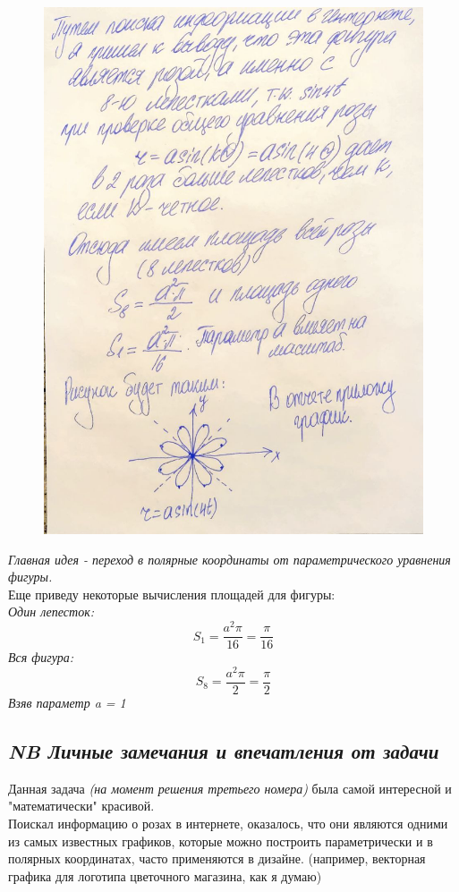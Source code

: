 \documentclass[a4paper,12pt]{article}
\begin{document}
\begin{figure}[H]
    \centering
    \includegraphics[width=0.8\linewidth]{../img/3_2.jpg}
    \caption{}
    \label{fig:part1}
\end{figure}

\emph{Главная идея - переход в полярные координаты от параметрического уравнения фигуры.}\\
Еще приведу некоторые вычисления площадей для фигуры:\\
\emph{Один лепесток:}
\[
S_1 = \frac{a^2  \pi}{16} = \frac{\pi}{16}
\]
\emph{Вся фигура:}
\[
S_8 = \frac{a^2  \pi}{2} = \frac{\pi}{2}
\]
\emph{Взяв параметр a = 1}

\subsection*{\emph{NB Личные замечания и впечатления от задачи}}
Данная задача \emph{(на момент решения третьего номера)} была самой интересной и 
"математически" красивой. \\
Поискал информацию о розах в интернете, оказалось, что 
они являются одними из самых известных графиков, которые можно построить параметрически 
и в полярных координатах, часто применяются в дизайне. (например, векторная графика для логотипа
цветочного магазина, как я думаю)\\
\end{document}
